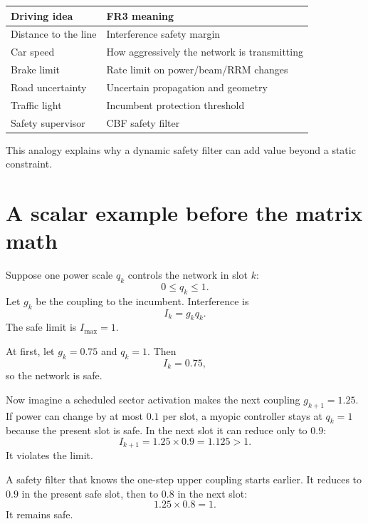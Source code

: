 \documentclass[11pt]{article}
\begin{document}
\begin{center}
\begin{tabular}{ll}
\toprule
Driving idea & FR3 meaning\\
\midrule
Distance to the line & Interference safety margin\\
Car speed & How aggressively the network is transmitting\\
Brake limit & Rate limit on power/beam/RRM changes\\
Road uncertainty & Uncertain propagation and geometry\\
Traffic light & Incumbent protection threshold\\
Safety supervisor & CBF safety filter\\
\bottomrule
\end{tabular}
\end{center}

This analogy explains why a dynamic safety filter can add value beyond a static constraint.

\section{A scalar example before the matrix math}

Suppose one power scale $q_k$ controls the network in slot $k$:
\begin{equation}
 0\le q_k\le1.
\end{equation}
Let $g_k$ be the coupling to the incumbent. Interference is
\begin{equation}
 I_k=g_kq_k.
\end{equation}
The safe limit is $I_{\max}=1$.

At first, let $g_k=0.75$ and $q_k=1$. Then
\begin{equation}
 I_k=0.75,
\end{equation}
so the network is safe.

Now imagine a scheduled sector activation makes the next coupling $g_{k+1}=1.25$. If power can change by at most $0.1$ per slot, a myopic controller stays at $q_k=1$ because the present slot is safe. In the next slot it can reduce only to $0.9$:
\begin{equation}
 I_{k+1}=1.25\times0.9=1.125>1.
\end{equation}
It violates the limit.

A safety filter that knows the one-step upper coupling starts earlier. It reduces to $0.9$ in the present safe slot, then to $0.8$ in the next slot:
\begin{equation}
 1.25\times0.8=1.
\end{equation}
It remains safe.
\end{document}
